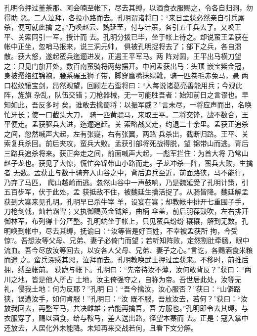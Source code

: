 孔明令押过董荼那、阿会喃至帐下，尽去其缚，以酒食衣服赐之，令各自归洞，勿得助
恶。二人泣拜，各投小路而去。孔明谓诸将曰：“来日孟获必然亲自引兵厮杀，便可就此擒
之。”乃唤赵云、魏延至，付与计策，各引五千兵去了。又唤王平、关索同引一军，授计而
去。孔明分拨已毕，坐于帐上待之。却说蛮王孟获在帐中正坐，忽哨马报来，说三洞元帅，
俱被孔明捉将去了；部下之兵，各自溃散。获大怒，遂起蛮兵迤逦进发，正遇王平军马。两
阵对圆，王平出马横刀望之：只见门旗开处，数百南蛮骑将两势摆开。中间孟获出马：头顶
嵌宝紫金冠，身披缨络红锦袍，腰系碾玉狮子带，脚穿鹰嘴抹绿靴，骑一匹卷毛赤兔马，悬
两口松纹镶宝剑，昂然观望，回顾左右蛮将曰：“人每说诸葛亮善能用兵；今观此阵，旌旗
杂乱，队伍交错；刀枪器械，无一可能胜吾者：始知前日之言谬也。早知如此，吾反多时
矣。谁敢去擒蜀将：以振军威？”言未尽，一将应声而出，名唤忙牙长；使一口截头大刀，
骑一匹黄骠马，来取王平。二将交锋，战不数合，王平便走。孟获驱兵大进，迤逦追赶。关
索略战又走，约退二十余里。孟获正追杀之间，忽然喊声大起，左有张嶷，右有张翼，两路
兵杀出，截断归路。王平、关索复兵杀回。前后夹攻，蛮兵大败。孟获引部将死战得脱，望
锦带山而逃。背后三路兵追杀将来。获正奔走之间，前面喊声大起，一彪军拦住：为首大将
乃常山赵子龙也。获见了大惊，慌忙奔锦带山小路而走。子龙冲杀一阵，蛮兵大败，生擒者
无数。孟获止与数十骑奔入山谷之中，背后追兵至近，前面路狭，马不能行，乃弃了马匹，
爬山越岭而逃。忽然山谷中一声鼓响，乃是魏延受了孔明计策，引五百步军，伏于此处，孟
获抵敌不住，被魏延生擒活捉了。从骑皆降。魏延解孟获到大寨来见孔明。孔明早已杀牛宰
羊，设宴在寨；却教帐中排开七重围子手，刀枪剑戟，灿若霜雪；又执御赐黄金钺斧，曲柄
伞盖，前后羽葆鼓吹，左右排开御林军，布列得十分严整。孔明端坐于帐上，只见蛮兵纷纷
穰穰，解到无数。孔明唤到帐中，尽去其缚，抚谕曰：“汝等皆是好百姓，不幸被孟获所
拘，今受惊?。吾想汝等父母、兄弟、妻子必倚门而望；若听知阵败，定然割肚牵肠，眼中
流血。吾今尽放汝等回去，以安各人父母、兄弟、妻子之心。”言讫，各赐酒食米粮而遣
之。蛮兵深感其恩，泣拜而去。孔明教唤武士押过孟获来。不移时，前推后拥，缚至帐前。
获跪与帐下。孔明曰：“先帝待汝不薄，汝何敢背反？”获曰：“两川之地，皆是他人所占
土地，汝主倚强夺之，自称为帝。吾世居此处，汝等无礼，侵我土地：何为反耶？”孔明
曰：“吾今擒汝，汝心服否？”获曰：“山僻路狭，误遭汝手，如何肯服！”孔明曰：“汝
既不服，吾放汝去，若何？”获曰：“汝放我回去，再整军马，共决雌雄；若能再擒吾，吾
方服也。”孔明即令去其缚。与衣服穿了，赐以酒食，给与鞍马，差人送出路，径望本寨而
去。正是：寇入掌中还放去，人居化外未能降。未知再来交战若何，且看下文分解。
